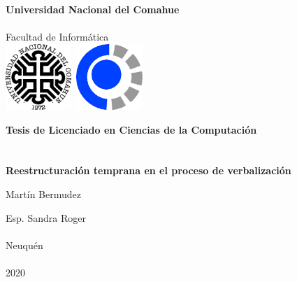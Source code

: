 
\titlepage

\begin{center}
\ \\
\ \\
\vspace{-1cm}
 

\ \\

\vspace{0.5cm}
{\Large{\bf \sc Universidad Nacional del Comahue}}\\

\ \\
{\Large { \sc Facultad de Informática}}\\

\vspace{-2.5cm}
\mbox{\hspace{-1cm}\includegraphics[width=2.5cm,height=2.5cm]{img/unc.png}\hspace{13cm} \includegraphics[width=2.5cm,height=2.5cm]{img/fai.png}}


\vspace{6cm}

{\Large {\bf\sc Tesis de Licenciado en Ciencias de la Computación}}\\
\ \\
\ \\
{\LARGE {\bf Reestructuración temprana en el proceso de verbalización}}\\
\vspace{3cm}


{\Large Martín Bermudez}\\
\vspace{2cm}

{\Large Esp. Sandra Roger}\\
\ \\

\vfill
{\Large {\sc Neuquén}\hspace{6cm}{\sc Argentina}}\\
\ \\

{\Large 2020}\\

\end{center}

\pagebreak

